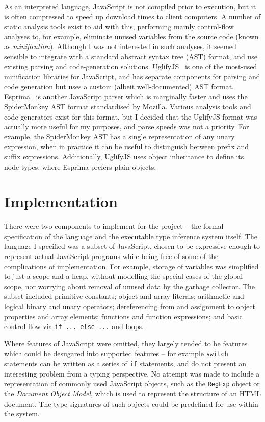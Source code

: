 \documentclass[12pt,a4paper,twoside,openright]{report}
\newcommand*{\js}{\texttt}
\begin{document}
As an interpreted language, JavaScript is not compiled prior to execution, but
it is often compressed to speed up download times to client computers. A number
of static analysis tools exist to aid with this, performing mainly control-flow
analyses to, for example, eliminate unused variables from the source code
(known as \textit{minification}). Although I was not interested in such
analyses, it seemed sensible to integrate with a standard abstract syntax tree
(AST) format, and use existing parsing and code-generation solutions.
UglifyJS~\cite{uglify} is one of the most-used minification libraries for
JavaScript, and has separate components for parsing and code generation but
uses a custom (albeit well-documented) AST format. Esprima~\cite{esprima} is
another JavaScript parser which is marginally faster and uses the SpiderMonkey
AST format standardised by Mozilla. Various analysis tools and code generators
exist for this format, but I decided that the UglifyJS format was actually more
useful for my purposes, and parse speeds was not a priority. For example, the
SpiderMonkey AST has a single representation of any unary expression, when in
practice it can be useful to distinguish between prefix and suffix expressions.
Additionally, UglifyJS uses object inheritance to define its node types, where
Esprima prefers plain objects. 

\chapter{Implementation}\label{implementation}

There were two components to implement for the project -- the formal
specification of the language and the executable type inference system itself.
The language I specified was a subset of JavaScript, chosen to be expressive
enough to represent actual JavaScript programs while being free of some of the
complications of implementation. For example, storage of variables was
simplified to just a scope and a heap, without modelling the special cases of
the global scope, nor worrying about removal of unused data by the garbage
collector. The subset included primitive constants; object and array literals;
arithmetic and logical binary and unary operators; dereferencing from and
assignment to object properties and array elements; functions and function
expressions; and basic control flow via \js{if ... else ...} and loops. 

Where features of JavaScript were omitted, they largely tended to be features
which could be desugared into supported features -- for example \js{switch}
statements can be written as a series of \js{if} statements, and do not present
an interesting problem from a typing perspective. No attempt was made to
include a representation of commonly used JavaScript objects, such as the
\js{RegExp} object or the \textit{Document Object Model}, which is used to
represent the structure of an HTML document. The type signatures of such objects
could be predefined for use within the system.
\end{document}
